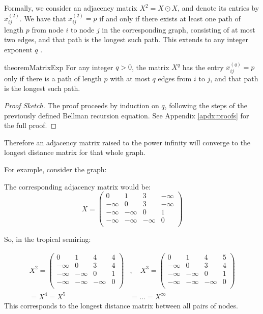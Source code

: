 Formally, we consider an adjacency matrix $X^{2} = X \odot X$, and denote its entries by $x_{ij}^{(2)}$. We have that $x_{ij}^{(2)} = p$
if and only if there exists at least one path of length $p$ from node $i$ to node $j$ in the corresponding graph,
consisting of at most two edges, and that path is the longest such path. This extends to any integer exponent $q$
\cite{krivulin2012maxplusalgebraapproachmodelling}.


\begin{restatable}{theorem}{MatrixExp} \label{thm:mat-exp-longest-paths}
For any integer $q>0$, the matrix
$X^{q}$ has the entry $x_{ij}^{(q)} = p$ only if there is a path of length $p$ with at most $q$ edges from $i$ to $j$,
and that path is the longest such path.
\end{restatable}
\begin{proof}[Proof Sketch]
  The proof proceeds by induction on $q$, following the steps of the previously defined Bellman recursion equation.
  See Appendix \ref{apdx:proofs} for the full proof.
\end{proof}

Therefore an adjacency matrix raised to the power infinity will converge to the longest distance matrix for that whole graph.

For example, consider the graph:
\begin{center}
  
\end{center}

The corresponding adjacency matrix would be:
$$
X = 
\begin{pmatrix}
  0 & 1 & 3 & -\infty \\ 
  -\infty & 0 & 3 & -\infty \\ 
  -\infty & -\infty & 0 & 1 \\
  -\infty & -\infty & -\infty & 0 \\
\end{pmatrix}
$$

So, in the tropical semiring:

$$
\begin{aligned}
  X^{2} = 
  \begin{pmatrix}
    0 & 1 & 4 & 4 \\ 
    -\infty & 0 & 3 & 4 \\ 
    -\infty & -\infty & 0 & 1 \\ 
    -\infty & -\infty & -\infty & 0 \\
  \end{pmatrix}&,\quad
  X^{3} = 
  \begin{pmatrix}
    0 & 1 & 4 & 5 \\ 
    -\infty & 0 & 3 & 4 \\ 
    -\infty & -\infty & 0 & 1 \\ 
    -\infty & -\infty & -\infty & 0 \\
  \end{pmatrix} \\ 
  = X^{4} = X^{5} &= \dots = X^{\infty}
\end{aligned}
$$
This corresponds to the longest distance matrix between all pairs of nodes.

